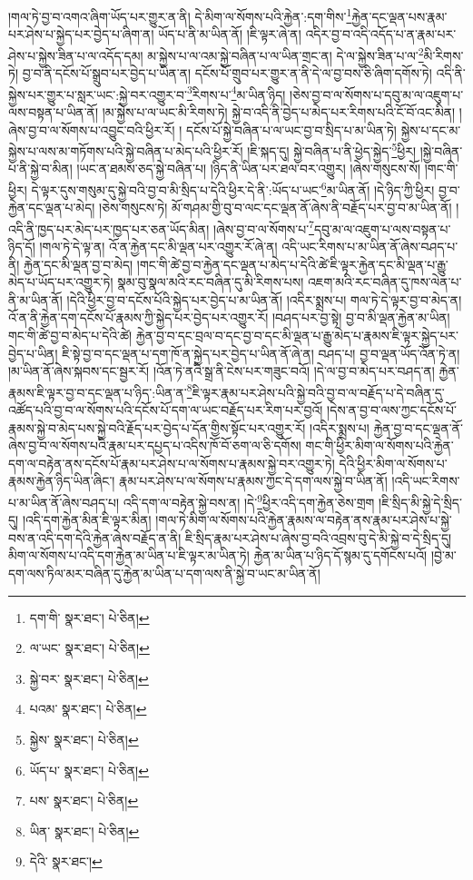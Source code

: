 །གལ་ཏེ་བྱ་བ་འགའ་ཞིག་ཡོད་པར་གྱུར་ན་ནི། དེ་མིག་ལ་སོགས་པའི་རྐྱེན་:དག་གིས་\footnote{དག་གི་  སྣར་ཐང་།  པེ་ཅིན། }རྐྱེན་དང་ལྡན་པས་རྣམ་པར་ཤེས་པ་སྐྱེད་པར་བྱེད་པ་ཞིག་ན། ཡོད་པ་ནི་མ་ཡིན་ནོ། །ཇི་ལྟར་ཞེ་ན། འདིར་བྱ་བ་འདི་འདོད་པ་ན་རྣམ་པར་ཤེས་པ་སྐྱེས་ཟིན་པ་ལ་འདོད་དམ། མ་སྐྱེས་པ་ལ་འམ་སྐྱེ་བཞིན་པ་ལ་ཡིན་གྲང་ན། དེ་ལ་སྐྱེས་ཟིན་པ་ལ་\footnote{ལ་ཡང་  སྣར་ཐང་།  པེ་ཅིན། }མི་རིགས་ཏེ། བྱ་བ་ནི་དངོས་པོ་སྒྲུབ་པར་བྱེད་པ་ཡིན་ན། དངོས་པོ་གྲུབ་པར་གྱུར་ན་ནི་དེ་ལ་བྱ་བས་ཅི་ཞིག་དགོས་ཏེ། འདི་ནི་སྐྱེས་པར་གྱུར་པ་སླར་ཡང་:སྐྱེ་བར་འགྱུར་བ་\footnote{སྐྱེ་བར་  སྣར་ཐང་།  པེ་ཅིན། }རིགས་པ་\footnote{པའམ་  སྣར་ཐང་།  པེ་ཅིན། }མ་ཡིན་ཉིད། །ཅེས་བྱ་བ་ལ་སོགས་པ་དབུ་མ་ལ་འཇུག་པ་ལས་བསྟན་པ་ཡིན་ནོ། །མ་སྐྱེས་པ་ལ་ཡང་མི་རིགས་ཏེ། སྐྱེ་བ་འདི་ནི་བྱེད་པ་མེད་པར་རིགས་པའི་ངོ་བོ་འང་མིན། །ཞེས་བྱ་བ་ལ་སོགས་པ་འབྱུང་བའི་ཕྱིར་རོ། །
དངོས་པོ་སྐྱེ་བཞིན་པ་ལ་ཡང་བྱ་བ་སྲིད་པ་མ་ཡིན་ཏེ། སྐྱེས་པ་དང་མ་སྐྱེས་པ་ལས་མ་གཏོགས་པའི་སྐྱེ་བཞིན་པ་མེད་པའི་ཕྱིར་རོ། །ཇི་སྐད་དུ། སྐྱེ་བཞིན་པ་ནི་ཕྱེད་སྐྱེད་\footnote{སྐྱེས་  སྣར་ཐང་།  པེ་ཅིན། }ཕྱིར། །སྐྱེ་བཞིན་པ་ནི་སྐྱེ་བ་མིན། །ཡང་ན་ཐམས་ཅད་སྐྱེ་བཞིན་པ། །ཉིད་ནི་ཡིན་པར་ཐལ་བར་འགྱུར། །ཞེས་གསུངས་སོ། །གང་གི་ཕྱིར། དེ་ལྟར་དུས་གསུམ་དུ་སྐྱེ་བའི་བྱ་བ་མི་སྲིད་པ་དེའི་ཕྱིར་དེ་ནི་:ཡོད་པ་ཡང་\footnote{ཡོད་པ་  སྣར་ཐང་།  པེ་ཅིན། }མ་ཡིན་ནོ། །དེ་ཉིད་ཀྱི་ཕྱིར། བྱ་བ་རྐྱེན་དང་ལྡན་པ་མེད། །ཅེས་གསུངས་ཏེ། མོ་གཤམ་གྱི་བུ་བ་ལང་དང་ལྡན་ནོ་ཞེས་ནི་བརྗོད་པར་བྱ་བ་མ་ཡིན་ནོ། །འདི་ནི་ཁྱད་པར་མེད་པར་ཁྱད་པར་ཅན་ཡོད་མིན། །ཞེས་བྱ་བ་ལ་སོགས་པ་\footnote{པས་  སྣར་ཐང་།  པེ་ཅིན། }དབུ་མ་ལ་འཇུག་པ་ལས་བསྟན་པ་ཉིད་དོ། །གལ་ཏེ་དེ་ལྟ་ན། འོ་ན་རྐྱེན་དང་མི་ལྡན་པར་འགྱུར་རོ་ཞེ་ན། འདི་ཡང་རིགས་པ་མ་ཡིན་ནོ་ཞེས་བཤད་པ་ནི། རྐྱེན་དང་མི་ལྡན་བྱ་བ་མེད། །གང་གི་ཚེ་བྱ་བ་རྐྱེན་དང་ལྡན་པ་མེད་པ་དེའི་ཚེ་ཇི་ལྟར་རྐྱེན་དང་མི་ལྡན་པ་རྒྱུ་མེད་པ་ཡོད་པར་འགྱུར་ཏེ། སྣམ་བུ་སྣལ་མའི་རང་བཞིན་དུ་མི་རིགས་པས། འཇག་མའི་རང་བཞིན་དུ་ཁས་ལེན་པ་ནི་མ་ཡིན་ནོ། །དེའི་ཕྱིར་བྱ་བ་དངོས་པོའི་སྐྱེད་པར་བྱེད་པ་མ་ཡིན་ནོ། །འདིར་སྨྲས་པ། གལ་ཏེ་དེ་ལྟར་བྱ་བ་མེད་ན། འོ་ན་ནི་རྐྱེན་དག་དངོས་པོ་རྣམས་ཀྱི་སྐྱེད་པར་བྱེད་པར་འགྱུར་རོ། །བཤད་པར་བྱ་སྟེ། བྱ་བ་མི་ལྡན་རྐྱེན་མ་ཡིན། གང་གི་ཚེ་བྱ་བ་མེད་པ་དེའི་ཚེ། རྐྱེན་བྱ་བ་དང་བྲལ་བ་དང་བྱ་བ་དང་མི་ལྡན་པ་རྒྱུ་མེད་པ་རྣམས་ཇི་ལྟར་སྐྱེད་པར་བྱེད་པ་ཡིན། ཇི་སྟེ་བྱ་བ་དང་ལྡན་པ་དག་ཁོ་ན་སྐྱེད་པར་བྱེད་པ་ཡིན་ནོ་ཞེ་ན། བཤད་པ། བྱ་བ་ལྡན་ཡོད་འོན་ཏེ་ན། །མ་ཡིན་ནོ་ཞེས་སྐབས་དང་སྦྱར་རོ། །འོན་ཏེ་ནའི་སྒྲ་ནི་ངེས་པར་གཟུང་བའོ། །དེ་ལ་བྱ་བ་མེད་པར་བཤད་ན། རྐྱེན་རྣམས་ཇི་ལྟར་བྱ་བ་དང་ལྡན་པ་ཉིད་:ཡིན་ན་\footnote{ཡིན་  སྣར་ཐང་།  པེ་ཅིན། }ཇི་ལྟར་རྣམ་པར་ཤེས་པའི་སྐྱེ་བའི་བྱ་བ་ལ་བརྗོད་པ་དེ་བཞིན་དུ་འཚོད་པའི་བྱ་བ་ལ་སོགས་པའི་དངོས་པོ་དག་ལ་ཡང་བརྗོད་པར་རིག་པར་བྱའོ། །དེས་ན་བྱ་བ་ལས་ཀྱང་དངོས་པོ་རྣམས་སྐྱེ་བ་མེད་པས་སྐྱེ་བའི་རྗོད་པར་བྱེད་པ་དོན་གྱིས་སྟོང་པར་འགྱུར་རོ། །འདིར་སྨྲས་པ། རྐྱེན་བྱ་བ་དང་ལྡན་ནོ་ཞེས་བྱ་བ་ལ་སོགས་པའི་རྣམ་པར་དཔྱད་པ་འདིས་ཁོ་བོ་ཅག་ལ་ཅི་དགོས། གང་གི་ཕྱིར་མིག་ལ་སོགས་པའི་རྐྱེན་དག་ལ་བརྟེན་ནས་དངོས་པོ་རྣམ་པར་ཤེས་པ་ལ་སོགས་པ་རྣམས་སྐྱེ་བར་འགྱུར་ཏེ། དེའི་ཕྱིར་མིག་ལ་སོགས་པ་རྣམས་རྐྱེན་ཉིད་ཡིན་ཞིང་། རྣམ་པར་ཤེས་པ་ལ་སོགས་པ་རྣམས་ཀྱང་དེ་དག་ལས་སྐྱེ་བ་ཡིན་ནོ། །འདི་ཡང་རིགས་པ་མ་ཡིན་ནོ་ཞེས་བཤད་པ། འདི་དག་ལ་བརྟེན་སྐྱེ་བས་ན། །དེ་\footnote{དེའི་  སྣར་ཐང་། }ཕྱིར་འདི་དག་རྐྱེན་ཅེས་གྲག །ཇི་སྲིད་མི་སྐྱེ་དེ་སྲིད་དུ། །འདི་དག་རྐྱེན་མིན་ཇི་ལྟར་མིན། །གལ་ཏེ་མིག་ལ་སོགས་པའི་རྐྱེན་རྣམས་ལ་བརྟེན་ནས་རྣམ་པར་ཤེས་པ་སྐྱེ་བས་ན་འདི་དག་དེའི་རྐྱེན་ཞེས་བརྗོད་ན་ནི། ཇི་སྲིད་རྣམ་པར་ཤེས་པ་ཞེས་བྱ་བའི་འབྲས་བུ་དེ་མི་སྐྱེ་བ་དེ་སྲིད་དུ། མིག་ལ་སོགས་པ་འདི་དག་རྐྱེན་མ་ཡིན་པ་ཇི་ལྟར་མ་ཡིན་ཏེ། རྐྱེན་མ་ཡིན་པ་ཉིད་དོ་སྙམ་དུ་དགོངས་པའོ། །བྱེ་མ་དག་ལས་ཏིལ་མར་བཞིན་དུ་རྐྱེན་མ་ཡིན་པ་དག་ལས་ནི་སྐྱེ་བ་ཡང་མ་ཡིན་ནོ། 
